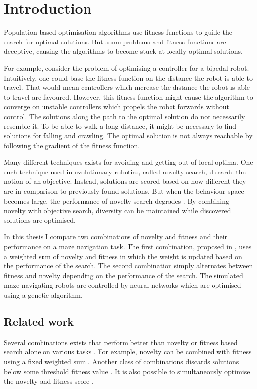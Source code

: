 \section{Introduction}

\label{sec:intro}

Population based optimisation algorithms use fitness functions to guide the search for optimal solutions.
But some problems and fitness functions are deceptive, causing the algorithms to become stuck at
locally optimal solutions.

For example, consider the problem of optimising a controller for a bipedal
robot. Intuitively, one could base the fitness function on the distance the robot is able to travel.
That would mean controllers which increase the distance the robot is able to travel are favoured.
However, this fitness function might cause the algorithm to converge on unstable controllers which
propels the robot forwards without control. The solutions along the path to the optimal solution
do not necessarily resemble it. To be able to walk a long distance, it might be necessary to find
solutions for falling and crawling. The optimal solution is not always reachable by following
the gradient of the fitness function.

Many different techniques exists for avoiding and getting out of local optima. One such technique used
in evolutionary robotics, called
novelty search, discards the notion of an objective. Instead, solutions are scored based on how different
they are in comparison to previously found solutions. But when the behaviour space becomes large, the performance
of novelty search degrades \cite{novelty_not_enough}. By combining novelty with objective search, diversity
can be maintained while discovered solutions are optimised.

In this thesis I compare two combinations of novelty and fitness and their performance
on a maze navigation task. The first combination, proposed in \cite{novelty_not_enough}, uses a weighted
sum of novelty and fitness in which the weight is updated based on the performance of the search.
The second combination simply alternates between fitness and novelty depending on the performance
of the search. The simulated maze-navigating robots are controlled by neural networks which are
optimised using a genetic algorithm.

\subsection{Related work}
Several combinations exists that perform better than novelty or fitness based search alone
on various tasks \cite{ns_study}. For example, novelty can be combined with fitness using a
fixed weighted sum \cite{novelty_not_enough}. Another class of combinations discards solutions below
some threshold fitness value \cite{minimal_ns}. It is also possible to simultaneously optimise
the novelty and fitness score \cite{multi_ns}.
